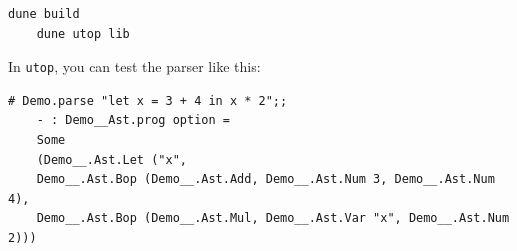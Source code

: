 \begin{Example}
    \begin{lstlisting}[numbers=none]
    dune build
    dune utop lib
    \end{lstlisting}
    
    \noindent
    In \texttt{utop}, you can test the parser like this:
    
    \begin{lstlisting}[numbers=none]
    # Demo.parse "let x = 3 + 4 in x * 2";;
    - : Demo__Ast.prog option =
    Some
    (Demo__.Ast.Let ("x",
    Demo__.Ast.Bop (Demo__.Ast.Add, Demo__.Ast.Num 3, Demo__.Ast.Num 4),
    Demo__.Ast.Bop (Demo__.Ast.Mul, Demo__.Ast.Var "x", Demo__.Ast.Num 2)))
    \end{lstlisting}
    \end{Example}
        
        
        